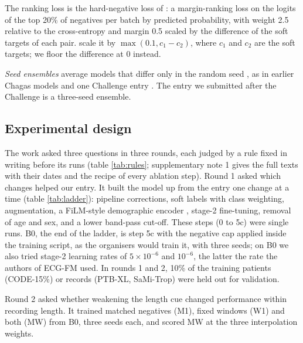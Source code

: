 \documentclass{iopjournal}
\begin{document}
The ranking loss is the hard-negative loss of \citet{hong2025}: a margin-ranking loss on the logits of the top 20\% of negatives per batch by predicted probability, with weight 2.5 relative to the cross-entropy and margin 0.5 scaled by the difference of the soft targets of each pair.  scale it by $\max(0.1, c_1-c_2)$, where $c_1$ and $c_2$ are the soft targets; we floor the difference at 0 instead.

\textit{Seed ensembles} average models that differ only in the random seed \citep{lakshminarayanan2017}, as in earlier Chagas models and one Challenge entry \citep{jidling2023,nejedly2025}. The entry we submitted after the Challenge is a three-seed ensemble.

\subsection{Experimental design}
\label{sec:design}
The work asked three questions in three rounds, each judged by a rule fixed in writing before its runs (table \ref{tab:rules}; supplementary note 1 gives the full texts with their dates and the recipe of every ablation step). Round 1 asked which changes helped our entry. It built the model up from the entry one change at a time (table \ref{tab:ladder}): pipeline corrections, soft labels with class weighting, augmentation, a FiLM-style demographic encoder \citep{perez2018,vansantvliet2025}, stage-2 fine-tuning, removal of age and sex, and a lower band-pass cut-off. These steps (0 to 5c) were single runs. B0, the end of the ladder, is step 5c with the negative cap applied inside the training script, as the organisers would train it, with three seeds; on B0 we also tried stage-2 learning rates of $5\times10^{-6}$ and $10^{-6}$, the latter the rate the authors of ECG-FM used. In rounds 1 and 2, 10\% of the training patients (CODE-15\%) or records (PTB-XL, SaMi-Trop) were held out for validation.

Round 2 asked whether weakening the length cue changed performance within recording length. It trained matched negatives (M1), fixed windows (W1) and both (MW) from B0, three seeds each, and scored MW at the three interpolation weights.
\end{document}
